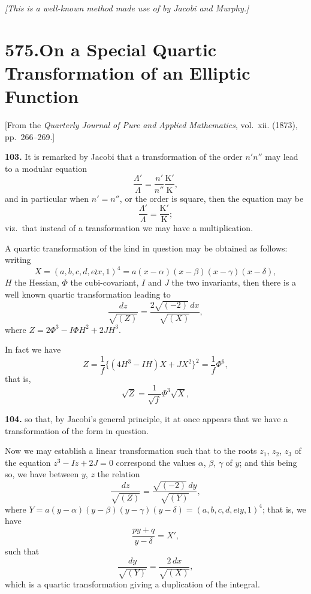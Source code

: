 \documentclass[11pt,a4paper]{book}
\begin{document}
\smallskip
\textit{[This is a well-known method made use of by Jacobi and Murphy.]}


\newpage
\section*{575.\quad On a Special Quartic Transformation of an Elliptic Function}

\begin{flushright}
\small[From the \textit{Quarterly Journal of Pure and Applied Mathematics}, vol.~xii. (1873), pp.~266--269.]
\end{flushright}

\noindent\textbf{103.} It is remarked by Jacobi that a transformation of the order $n'n''$ may lead to a modular equation
\[
\frac{\Lambda'}{\Lambda} = \frac{n'}{n''}\frac{\mathrm{K}'}{\mathrm{K}},
\]
and in particular when $n' = n''$, or the order is square, then the equation may be
\[
\frac{\Lambda'}{\Lambda} = \frac{\mathrm{K}'}{\mathrm{K}};
\]
viz.\ that instead of a transformation we may have a multiplication.

A quartic transformation of the kind in question may be obtained as follows: writing
\[
X = (a, b, c, d, e\!\!\wr x, 1)^4 = a(x-\alpha)(x-\beta)(x-\gamma)(x-\delta),
\]
$H$ the Hessian, $\Phi$ the cubi-covariant, $I$ and $J$ the two invariants, then there is a well known quartic transformation leading to
\[
\frac{dz}{\sqrt{(Z)}} = \frac{2\sqrt{(-2)}\,dx}{\sqrt{(X)}},
\]
where $Z = 2\Phi^3 - I\Phi H^2 + 2JH^3$.

In fact we have
\[
Z = \frac{1}{f}\{(4H^3 - IH)X + JX^2\}^2 = \frac{1}{f}\Phi^6,
\]
that is,
\[
\sqrt{Z} = \frac{1}{\sqrt{f}}\Phi^3\sqrt{X},
\]

\noindent\textbf{104.} so that, by Jacobi's general principle, it at once appears that we have a transformation of the form in question.

Now we may establish a linear transformation such that to the roots $z_1$, $z_2$, $z_3$ of the equation $z^3 - Iz + 2J = 0$ correspond the values $\alpha$, $\beta$, $\gamma$ of $y$; and this being so, we have between $y$, $z$ the relation
\[
\frac{dz}{\sqrt{(Z)}} = \frac{\sqrt{(-2)}\,dy}{\sqrt{(Y)}},
\]
where $Y = a(y-\alpha)(y-\beta)(y-\gamma)(y-\delta) = (a, b, c, d, e\!\!\wr y, 1)^4$; that is, we have
\[
\frac{py + q}{y - \delta} = X',
\]
such that
\[
\frac{dy}{\sqrt{(Y)}} = \frac{2\,dx}{\sqrt{(X)}},
\]
which is a quartic transformation giving a duplication of the integral.
\end{document}

